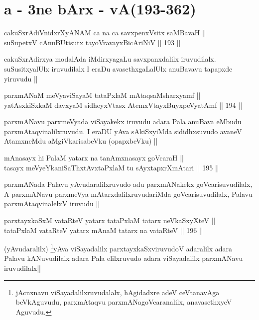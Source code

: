 \section*{a - 3ne bArx - vA(193-362)}

\begin{shl}
cakuSxrAdiVnidxrXyANAM ca na ca savxpenxV\s sitx saMBavaH || \\
suSupetxV cAnuBUtisutx tayoVravayxBicAriNiV ||  193 ||  
\end{shl}

\begin{artha}
cakuSxrAdirxya modalAda iMdirxyagaLu savxpanxdalilx iruvudilalx. suSusitxyalUlx iruvudilalx I eraDu avasethxgaLalUlx anuBavavu tapapxde yiruvudu ||
\end{artha}

\begin{shl}
parxmANaM meVyaviSayaM tataPxlaM mAtaqsaMsharxyamf || \\
yatAsxkiSxkaM davxyaM sidheyxVtasx AtemxVtayxBuyxpeVyatAmf ||  194 ||  
\end{shl}

\begin{artha}
parxmANavu parxmeVyada viSayakekx iruvudu adara Pala anuBava eMbudu parxmAtaqvinalilxruvudu. I eraDU yAva sAkiSxyiMda sididhxsuvudo avaneV AtamxneMdu aMgiVkarisabeVku (opapxbeVku) ||
\end{artha}

\begin{shl}
mAnasayx hi PalaM yatarx na tanAmxnasayx goVcaraH || \\
tasayx meVyeYkaniSaThxtAvxtaPxlaM tu sAyxtapxrXmAtari ||  195 ||  
\end{shl}

\begin{artha}
parxmANada Palavu yAvudaralilxruvudo adu parxmANakekx goVcarisuvudilalx, A parxmANavu parxmeVya mAtarxdalilxruvudariMda goVcarisuvudilalx, Palavu parxmAtaqvinalelxV iruvudu ||
\end{artha}

\begin{shl}
parxtayxkaSxM vataRteV yatarx tataPxlaM tatarx neVkaSxyXteV || \\
tataPxlaM vataRteV yatarx mAnaM tatarx na vataRteV ||  196 ||  
\end{shl}

\begin{artha}
(yAvudaralilx) \footnote{jAcnxnavu viSayadalilxruvudalalx, hAgidadxre adeV ceVtanavAga beVkAguvudu, parxmAtaqvu parxmANagoVcaranalilx, anavasethxyeV Aguvudu.}yAva viSayadalilx parxtayxkaSxviruvudoV adaralilx adara Palavu kANuvudilalx adara Pala elilxruvudo adara viSayadalilx parxmANavu iruvudilalx||
\end{artha}

